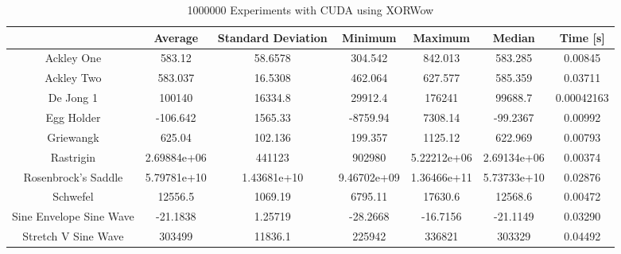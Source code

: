 \documentclass{article}
\begin{document}
	\begin{table}[h]
        \begin{centering}
            \begin{tabular}{|c||c|c|c|c|c|c|}
                \hline
                            & Average & Standard Deviation & Minimum & Maximum & Median & Time [s] \\
                \hline
                \hline
                Ackley One & 583.12 & 58.6578 & 304.542 & 842.013 & 583.285 & 0.00845 \\
                \hline
                Ackley Two & 583.037 & 16.5308 & 462.064 & 627.577 & 585.359 & 0.03711 \\
                \hline
                De Jong 1 & 100140 & 16334.8 & 29912.4 & 176241 & 99688.7 & 0.00042163\\
                \hline
                Egg Holder & -106.642 & 1565.33 & -8759.94 & 7308.14 & -99.2367 & 0.00992 \\
                \hline
                Griewangk & 625.04 & 102.136 & 199.357 & 1125.12 & 622.969 & 0.00793 \\
                \hline
                Rastrigin & 2.69884e+06 & 441123 & 902980 & 5.22212e+06 & 2.69134e+06 & 0.00374 \\
                \hline
                Rosenbrock's Saddle & 5.79781e+10 & 1.43681e+10 & 9.46702e+09 & 1.36466e+11 & 5.73733e+10 & 0.02876\\
                \hline
                Schwefel & 12556.5 & 1069.19 & 6795.11 & 17630.6 & 12568.6 & 0.00472 \\
                \hline
                Sine Envelope Sine Wave & -21.1838 & 1.25719 & -28.2668 & -16.7156 & -21.1149 & 0.03290 \\
                \hline
                Stretch V Sine Wave & 303499 & 11836.1 & 225942 & 336821 & 303329 & 0.04492 \\
                \hline
            \end{tabular}
            \caption{1000000 Experiments with CUDA using XORWow}
        \end{centering}
        \end{table}
\end{document}
